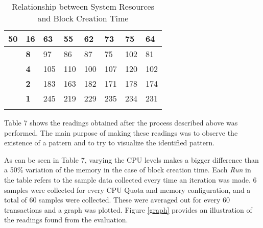 \documentclass[english]{tktltiki}
\begin{document}
\begin{table}[H]
\begin{tabular}{llllllll}
\multicolumn{1}{|l|}{\textbf{50}}             & \multicolumn{1}{l|}{\textbf{16}}  & \multicolumn{1}{l|}{63}            & \multicolumn{1}{l|}{55}            & \multicolumn{1}{l|}{62}            & \multicolumn{1}{l|}{73}            & \multicolumn{1}{l|}{75}            & \multicolumn{1}{l|}{64}            \\ \hline
\multicolumn{1}{|l|}{}                        & \multicolumn{1}{l|}{\textbf{8}}   & \multicolumn{1}{l|}{97}            & \multicolumn{1}{l|}{86}            & \multicolumn{1}{l|}{87}            & \multicolumn{1}{l|}{75}            & \multicolumn{1}{l|}{102}           & \multicolumn{1}{l|}{81}            \\ \hline
\multicolumn{1}{|l|}{}                        & \multicolumn{1}{l|}{\textbf{4}}   & \multicolumn{1}{l|}{105}           & \multicolumn{1}{l|}{110}           & \multicolumn{1}{l|}{100}           & \multicolumn{1}{l|}{107}           & \multicolumn{1}{l|}{120}           & \multicolumn{1}{l|}{102}           \\ \hline
\multicolumn{1}{|l|}{}                        & \multicolumn{1}{l|}{\textbf{2}}   & \multicolumn{1}{l|}{183}           & \multicolumn{1}{l|}{163}           & \multicolumn{1}{l|}{182}           & \multicolumn{1}{l|}{171}           & \multicolumn{1}{l|}{178}           & \multicolumn{1}{l|}{174}           \\ \hline
\multicolumn{1}{|l|}{}                        & \multicolumn{1}{l|}{\textbf{1}}   & \multicolumn{1}{l|}{245}           & \multicolumn{1}{l|}{219}           & \multicolumn{1}{l|}{229}           & \multicolumn{1}{l|}{235}           & \multicolumn{1}{l|}{234}           & \multicolumn{1}{l|}{231}           \\ \hline
                                              &                                   &                                    &                                    &                                    &                                    &                                    &                                   
\end{tabular}
\caption{Relationship between System Resources and Block Creation Time}
\label{readings}
\end{table}

Table 7 shows the readings obtained after the process described above was performed. The main purpose of making these readings was to observe the existence of a pattern and to try to visualize the identified pattern. 

As can be seen in Table 7, varying the CPU levels makes a bigger difference than a 50\% variation of the memory in the case of block creation time. Each \textit{Run} in the table refers to the sample data collected every time an iteration was made. 6 samples were collected for every CPU Quota and memory configuration, and a total of 60 samples were collected. These were averaged out for every 60 transactions and a graph was plotted. Figure \ref{graph} provides an illustration of the readings found from the evaluation.
\end{document}
